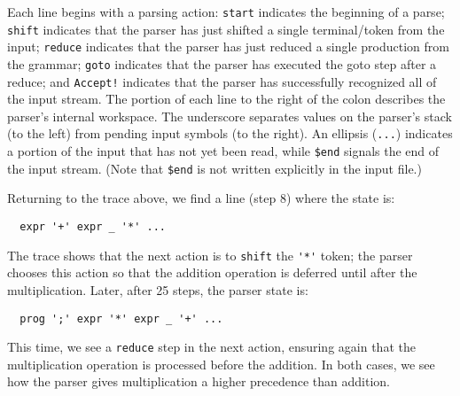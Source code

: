 \documentclass[12pt]{article}
\begin{document}
Each line begins with a parsing action:
\verb"start" indicates the beginning of a parse;
\verb"shift" indicates that the parser has just shifted a single
terminal/token from the input; \verb"reduce" indicates that the
parser has just reduced a single production from the grammar;
\verb"goto" indicates that the parser has executed the goto step
after a reduce; and \verb"Accept!" indicates that the parser has
successfully recognized all of the input stream.  The portion of
each line to the right of the colon describes the parser's internal
workspace.  The underscore separates values on the parser's stack
(to the left) from pending input symbols (to the
right).  An ellipsis (\verb"...") indicates a
portion of the input that has not yet been read, while \verb"$end"
signals the end of the input stream.  (Note that \verb"$end" is not
written explicitly in the input file.)

Returning to the trace above, we find a line (step 8) where
the state is:
{\small
\begin{verbatim}
  expr '+' expr _ '*' ...
\end{verbatim}
}%
The trace shows that the next action is to \verb"shift" the \verb"'*'"
token; the parser chooses this action so that the addition operation is
deferred until after the multiplication.  Later, after 25 steps, the
parser state is:
{\small
\begin{verbatim}
  prog ';' expr '*' expr _ '+' ...
\end{verbatim}
}%
This time, we see a \verb"reduce" step in the next action, ensuring
again that the multiplication operation is processed before the addition.
In both cases, we see how the parser gives multiplication
a higher precedence than addition.
\end{document}
